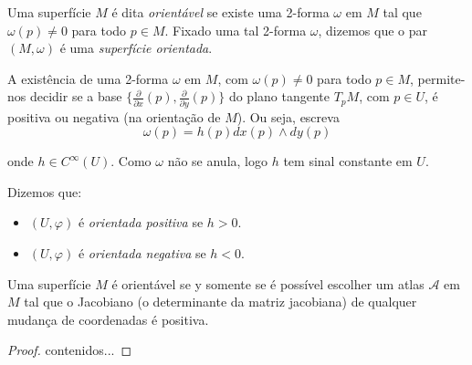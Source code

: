 \begin{defi}
	Uma superfície $M$ é dita \emph{orientável} se existe uma 2-forma $\omega$ em $M$ tal que $\omega(p) \neq 0$ para todo $p \in M$. Fixado uma tal 2-forma $\omega$, dizemos que o par $(M, \omega)$ é uma \emph{superfície orientada}.	
\end{defi}

A existência de uma 2-forma $\omega$ em $M$, com $\omega(p) \neq 0$ para todo $p \in M$, permite-nos decidir se a base $\{ \frac{\partial}{\partial x}(p), \frac{\partial}{\partial y}(p) \}$ do plano tangente $T_p M$, com $p \in U$, é positiva ou negativa (na orientação de $M$). Ou seja, escreva
\begin{equation*}
	\omega(p) = h(p) dx(p) \wedge dy(p)
\end{equation*}

onde $h \in C^{\infty}(U)$. Como $\omega$ não se anula, logo $h$ tem sinal constante em $U$.

Dizemos que:
\begin{itemize}
	\item $(U, \varphi)$ é \emph{orientada positiva} se $h >0$.
	\item $(U, \varphi)$ é \emph{orientada negativa} se $h<0$.
\end{itemize}

\begin{prop}
	Uma superfície $M$ é orientável se y somente se é possível escolher um atlas $\mathcal{A}$ em $M$ tal que o Jacobiano (o determinante da matriz jacobiana) de qualquer mudança de coordenadas é positiva.
\end{prop}

\begin{proof}
	contenidos...
\end{proof}